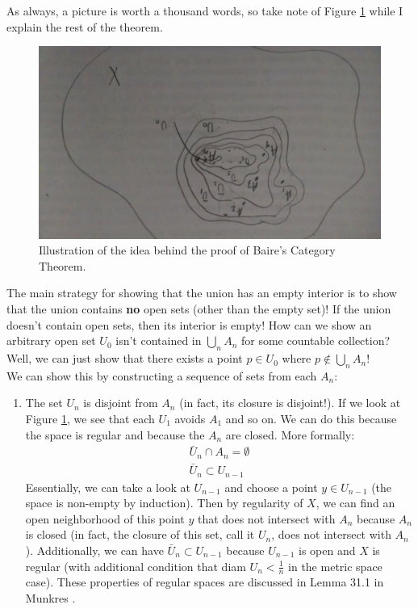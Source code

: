 \documentclass[english, 11pt]{article}
\begin{document}
  As always, a picture is worth a thousand words, so take note of Figure \ref{fig:baire_category_theorem} while I explain the rest of the theorem.\\

  \begin{figure}
    \centering
    \includegraphics[angle=180,scale=0.2]{baire_theorem_image.jpg}
    \caption{Illustration of the idea behind the proof of Baire's Category Theorem.}
    \label{fig:baire_category_theorem}
  \end{figure}

  The main strategy for showing that the union has an empty interior is to show that the union contains \textbf{no} open sets (other than the empty set)! If the union doesn't contain open sets, then its interior is empty! How can we show an arbitrary open set $U_0$ isn't contained in $\bigcup_n A_n$ for some countable collection? Well, we can just show that there exists a point $p \in U_0$ where $p \notin \bigcup_n A_n$! \\

  We can show this by constructing a sequence of sets from each $A_n$:
  \begin{enumerate}
    \item The set $U_n$ is disjoint from $A_n$ (in fact, its closure is disjoint!). If we look at Figure \ref{fig:baire_category_theorem}, we see that each $U_1$ avoids $A_1$ and so on. We can do this because the space is regular and because the $A_n$ are closed. More formally:
    \begin{align*}
      \bar{U}_n \cap A_n = \emptyset \\
      \bar{U}_n \subset U_{n-1}
    \end{align*}
    Essentially, we can take a look at $U_{n-1}$ and choose a point $y \in U_{n-1}$ (the space is non-empty by induction). Then by regularity of $X$, we can find an open neighborhood of this point $y$ that does not intersect with $A_n$ because $A_n$ is closed (in fact, the closure of this set, call it $U_n$, does not intersect with $A_n$). Additionally, we can have $\bar{U}_n \subset U_{n-1}$ because $U_{n-1}$ is open and $X$ is regular (with additional condition that diam $U_n < \frac{1}{n}$ in the metric space case). These properties of regular spaces are discussed in Lemma 31.1 in Munkres \cite{topology_book}.
  \end{enumerate}
\end{document}
